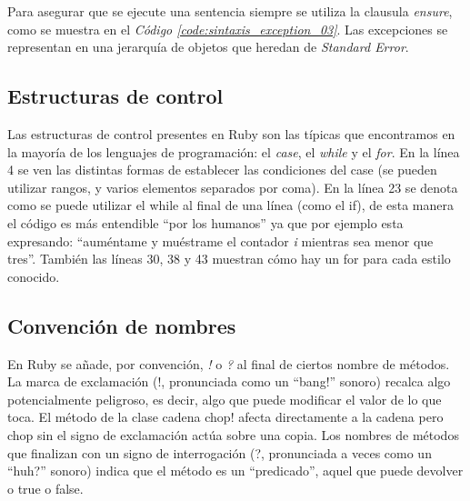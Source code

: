 \documentclass{article}
\newcommand{\refcode}[1]{\textit{Código \ref{#1}}}
\begin{document}
Para asegurar que se ejecute una sentencia siempre se utiliza la clausula \textit{ensure}, como se muestra en el \refcode{code:sintaxis_exception_03}. Las excepciones se representan en una jerarquía de objetos que heredan de \textit{Standard Error}. 
\bigskip

 
\bigskip\bigskip



\subsection{Estructuras de control}

Las estructuras de control presentes en Ruby son las típicas que encontramos en la mayoría de los lenguajes de programación: el \textit{case}, el \textit{while} y el \textit{for}. En la línea 4 se ven las distintas formas de establecer las condiciones del case (se pueden utilizar rangos, y varios elementos separados por coma). En la línea 23 se denota como se puede utilizar el while al final de una línea (como el if), de esta manera el código es más entendible “por los humanos” ya que por ejemplo esta expresando: “auméntame y muéstrame el contador \textit{i} mientras sea menor que tres”. También las líneas 30, 38 y 43 muestran cómo hay un for para cada estilo conocido.


\bigskip



\subsection{Convención de nombres}

En Ruby se añade, por convención, \textit{!} o \textit{?} al final de ciertos nombre de métodos.  La marca de exclamación (!, pronunciada como un “bang!” sonoro)  recalca algo potencialmente peligroso, es decir, algo que puede modificar el valor de lo que toca. El método de la clase cadena chop! afecta directamente a la cadena pero chop sin el signo de exclamación actúa sobre una copia.
Los nombres de métodos que finalizan con un signo de interrogación (?, pronunciada a veces como un “huh?” sonoro) indica que el método es un “predicado”, aquel que puede devolver o true o false.
\bigskip
\end{document}
